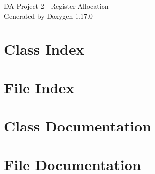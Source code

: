 \documentclass[twoside]{book}
\newcommand{\+}{\discretionary{\mbox{\scriptsize$\hookleftarrow$}}{}{}}
\newcommand{\clearemptydoublepage}{%
    \newpage{\pagestyle{empty}\cleardoublepage}%
  }
\begin{document}
  \raggedbottom
    \hypersetup{pageanchor=false,
                bookmarksnumbered=true,
                pdfencoding=unicode
               }
  \begin{titlepage}
  \vspace*{7cm}
  \begin{center}%
  {\Large DA Project 2 -\/ Register Allocation}\\
  \vspace*{1cm}
  {\large Generated by Doxygen 1.17.0}\\
  \end{center}
  \end{titlepage}
  \clearemptydoublepage
  \tableofcontents
  \clearemptydoublepage
  \hypersetup{pageanchor=true}
\chapter{Class Index}

\chapter{File Index}

\chapter{Class Documentation}









\chapter{File Documentation}










  \backmatter
  \newpage
  \clearemptydoublepage
  \printindex
\end{document}
